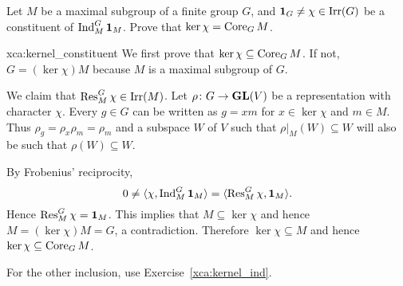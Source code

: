 \begin{exercise}
\label{xca:kernel_constituent}
    Let $M$ be a maximal subgroup of a finite group $G$, and $\mathbf{1}_G\ne\chi\in\operatorname{Irr}(G)$ be
    a constituent
    of $\operatorname{Ind}_M^G\mathbf{1}_M$. Prove that $\ker\chi=\operatorname{Core}_GM$. 
\end{exercise}

\begin{sol}{xca:kernel_constituent}
    We first prove that $\ker\chi\subseteq\operatorname{Core}_GM$. If not, $G=(\ker\chi)M$ because $M$ is a maximal subgroup of $G$.
    
    We claim that $\operatorname{Res}_M^G\chi\in\operatorname{Irr}(M)$. Let $\rho\colon G\to\mathbf{GL}(V)$ be a representation with character $\chi$.  
    Every $g\in G$ can be written as $g=xm$ for $x\in\ker\chi$ and $m\in M$. 
    Thus $\rho_g=\rho_x\rho_m=\rho_m$ and a subspace $W$ of $V$ such that $\rho|_M(W)\subseteq W$ 
    will also be such that $\rho(W)\subseteq W$. 

    By Frobenius' reciprocity, 
    \[
    0\ne\langle\chi,\operatorname{Ind}_M^G\mathbf{1}_M\rangle=\langle\operatorname{Res}_M^G\chi,\mathbf{1}_M\rangle.
    \]
    Hence $\operatorname{Res}_M^G\chi=\mathbf{1}_M$. This implies that $M\subseteq\ker\chi$ and hence 
    $M=(\ker\chi)M=G$, a contradiction.  Therefore $\ker\chi\subseteq M$ and 
    hence $\ker\chi\subseteq\operatorname{Core}_GM$. 

    For the other inclusion, use Exercise~\ref{xca:kernel_ind}.
\end{sol}

